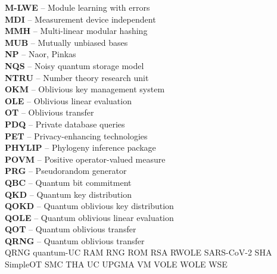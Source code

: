 \textbf{M-LWE} -- Module learning with errors
\vspace{0.5cm}\\
\textbf{MDI} -- Measurement device independent
\vspace{0.5cm}\\
\textbf{MMH} -- Multi-linear modular hashing
\vspace{0.5cm}\\
\textbf{MUB} -- Mutually unbiased bases
\vspace{0.5cm}\\
\textbf{NP} -- Naor, Pinkas
\vspace{0.5cm}\\
\textbf{NQS} -- Noisy quantum storage model
\vspace{0.5cm}\\
\textbf{NTRU} -- Number theory research unit
\vspace{0.5cm}\\
\textbf{OKM} -- Oblivious key management system
\vspace{0.5cm}\\
\textbf{OLE} -- Oblivious linear evaluation
\vspace{0.5cm}\\
\textbf{OT} -- Oblivious transfer
\vspace{0.5cm}\\
\textbf{PDQ} -- Private database queries
\vspace{0.5cm}\\
\textbf{PET} -- Privacy-enhancing technologies
\vspace{0.5cm}\\
\textbf{PHYLIP} -- Phylogeny inference package
\vspace{0.5cm}\\
\textbf{POVM} -- Positive operator-valued measure
\vspace{0.5cm}\\
\textbf{PRG} -- Pseudorandom generator
\vspace{0.5cm}\\
\textbf{QBC} -- Quantum bit commitment
\vspace{0.5cm}\\
\textbf{QKD} -- Quantum key distribution
\vspace{0.5cm}\\
\textbf{QOKD} -- Quantum oblivious key distribution
\vspace{0.5cm}\\
\textbf{QOLE} -- Quantum oblivious linear evaluation
\vspace{0.5cm}\\
\textbf{QOT} -- Quantum oblivious transfer
\vspace{0.5cm}\\
\textbf{QRNG} -- Quantum oblivious transfer
\vspace{0.5cm}\\
QRNG
quantum-UC
RAM
RNG
ROM
RSA
RWOLE
SARS-CoV-2
SHA
SimpleOT
SMC
THA
UC
UPGMA
VM
VOLE
WOLE
WSE






